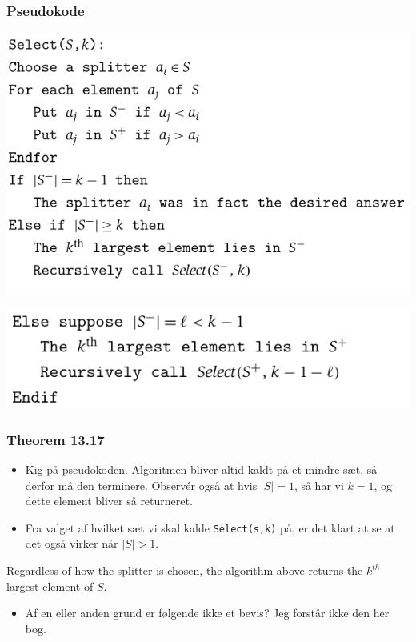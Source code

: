 \documentclass{beamer}
\begin{document}
\begin{frame}
  \frametitle{Pseudokode}

  \includegraphics[scale=0.5]{main--randomized-divide-and-conquer-median-finding-and-quicksort--finding-the-median-12da.png}

  \includegraphics[scale=0.5]{main--randomized-divide-and-conquer-median-finding-and-quicksort--finding-the-median-ae3b.png}
\end{frame}

\begin{frame}
  \frametitle{Theorem 13.17}

  \begin{itemize}
  \item Kig på pseudokoden. Algoritmen bliver altid kaldt på et mindre sæt, så derfor må den terminere. Observér også at hvis $|S| = 1$, så har vi $k = 1$, og dette element bliver så returneret. 
  \item Fra valget af hvilket sæt vi skal kalde \texttt{Select(s,k)} på, er det klart at se at det også virker når $|S| > 1$.
  \end{itemize}
 \begin{theorem}[13.17]
Regardless of how the splitter is chosen, the algorithm above returns the $k^{th}$ largest element of $S$.
\end{theorem}
\begin{itemize}
\item Af en eller anden grund er følgende ikke et bevis? Jeg forstår ikke den her bog.
\end{itemize}
\end{frame}
\end{document}
